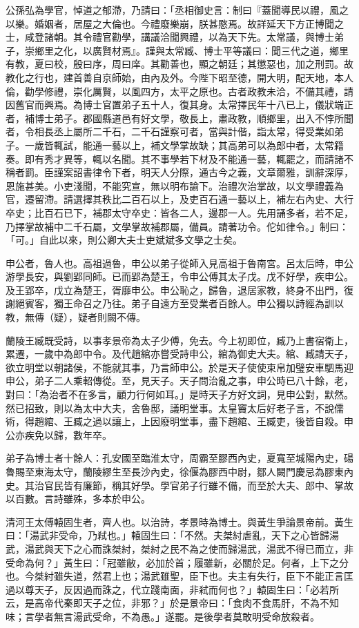\begin{pinyinscope}
公孫弘為學官，悼道之郁滯，乃請曰：「丞相御史言：制曰『蓋聞導民以禮，風之以樂。婚姻者，居屋之大倫也。今禮廢樂崩，朕甚愍焉。故詳延天下方正博聞之士，咸登諸朝。其令禮官勸學，講議洽聞興禮，以為天下先。太常議，與博士弟子，崇鄉里之化，以廣賢材焉』。謹與太常臧、博士平等議曰：聞三代之道，鄉里有教，夏曰校，殷曰序，周曰庠。其勸善也，顯之朝廷；其懲惡也，加之刑罰。故教化之行也，建首善自京師始，由內及外。今陛下昭至德，開大明，配天地，本人倫，勸學修禮，崇化厲賢，以風四方，太平之原也。古者政教未洽，不備其禮，請因舊官而興焉。為博士官置弟子五十人，復其身。太常擇民年十八已上，儀狀端正者，補博士弟子。郡國縣道邑有好文學，敬長上，肅政教，順鄉里，出入不悖所聞者，令相長丞上屬所二千石，二千石謹察可者，當與計偕，詣太常，得受業如弟子。一歲皆輒試，能通一藝以上，補文學掌故缺；其高弟可以為郎中者，太常籍奏。即有秀才異等，輒以名聞。其不事學若下材及不能通一藝，輒罷之，而請諸不稱者罰。臣謹案詔書律令下者，明天人分際，通古今之義，文章爾雅，訓辭深厚，恩施甚美。小吏淺聞，不能究宣，無以明布諭下。治禮次治掌故，以文學禮義為官，遷留滯。請選擇其秩比二百石以上，及吏百石通一藝以上，補左右內史、大行卒史；比百石已下，補郡太守卒史：皆各二人，邊郡一人。先用誦多者，若不足，乃擇掌故補中二千石屬，文學掌故補郡屬，備員。請著功令。佗如律令。」制曰：「可。」自此以來，則公卿大夫士吏斌斌多文學之士矣。

申公者，魯人也。高祖過魯，申公以弟子從師入見高祖于魯南宮。呂太后時，申公游學長安，與劉郢同師。已而郢為楚王，令申公傅其太子戊。戊不好學，疾申公。及王郢卒，戊立為楚王，胥靡申公。申公恥之，歸魯，退居家教，終身不出門，復謝絕賓客，獨王命召之乃往。弟子自遠方至受業者百餘人。申公獨以詩經為訓以教，無傳（疑），疑者則闕不傳。

蘭陵王臧既受詩，以事孝景帝為太子少傅，免去。今上初即位，臧乃上書宿衛上，累遷，一歲中為郎中令。及代趙綰亦嘗受詩申公，綰為御史大夫。綰、臧請天子，欲立明堂以朝諸侯，不能就其事，乃言師申公。於是天子使使束帛加璧安車駟馬迎申公，弟子二人乘軺傳從。至，見天子。天子問治亂之事，申公時已八十餘，老，對曰：「為治者不在多言，顧力行何如耳。」是時天子方好文詞，見申公對，默然。然已招致，則以為太中大夫，舍魯邸，議明堂事。太皇竇太后好老子言，不說儒術，得趙綰、王臧之過以讓上，上因廢明堂事，盡下趙綰、王臧吏，後皆自殺。申公亦疾免以歸，數年卒。

弟子為博士者十餘人：孔安國至臨淮太守，周霸至膠西內史，夏寬至城陽內史，碭魯賜至東海太守，蘭陵繆生至長沙內史，徐偃為膠西中尉，鄒人闕門慶忌為膠東內史。其治官民皆有廉節，稱其好學。學官弟子行雖不備，而至於大夫、郎中、掌故以百數。言詩雖殊，多本於申公。

清河王太傅轅固生者，齊人也。以治詩，孝景時為博士。與黃生爭論景帝前。黃生曰：「湯武非受命，乃弒也。」轅固生曰：「不然。夫桀紂虐亂，天下之心皆歸湯武，湯武與天下之心而誅桀紂，桀紂之民不為之使而歸湯武，湯武不得已而立，非受命為何？」黃生曰：「冠雖敝，必加於首；履雖新，必關於足。何者，上下之分也。今桀紂雖失道，然君上也；湯武雖聖，臣下也。夫主有失行，臣下不能正言匡過以尊天子，反因過而誅之，代立踐南面，非弒而何也？」轅固生曰：「必若所云，是高帝代秦即天子之位，非邪？」於是景帝曰：「食肉不食馬肝，不為不知味；言學者無言湯武受命，不為愚。」遂罷。是後學者莫敢明受命放殺者。


\end{pinyinscope}
